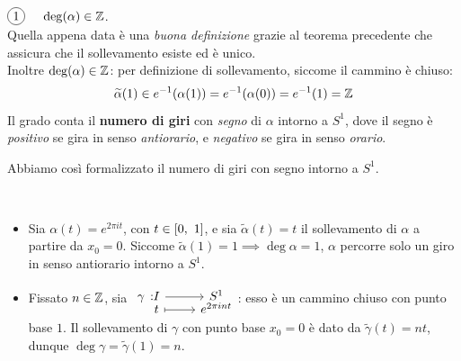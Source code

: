 \begin{observe} $\circled{1}\quad$ \textsc{$\deg(\alpha)\in\mathbb{Z}$.}\\
	Quella appena data è una \textit{buona definizione} grazie al teorema precedente che assicura che il sollevamento esiste ed è unico. \\
	Inoltre $\deg(\alpha)\in\mathbb{Z}$: per definizione di sollevamento, siccome il cammino è chiuso:
	\begin{equation*}
		\widetilde{\alpha}(1)\in e^{-1}(\alpha(1))=e^{-1}(\alpha(0))=e^{-1}(1)=\mathbb{Z}
	\end{equation*}
	Il grado conta il \textbf{numero di giri} con \textit{segno} di $\alpha$ intorno a $S^1$, dove il segno è \textit{positivo} se gira in senso \textit{antiorario}, e \textit{negativo} se gira in senso \textit{orario}.
\end{observe}
Abbiamo così formalizzato il numero di giri con segno intorno a $S^1$.
\begin{examples}~{}
	\begin{itemize}
		\item Sia $\alpha(t)=e^{2\pi i t}$, con $t\in\left[0,\ 1\right]$, e sia $\widetilde{\alpha}(t)=t$ il sollevamento di $\alpha$ a partire da $x_0=0$. Siccome $\widetilde{\alpha}(1)=1\implies \deg\alpha=1$, $\alpha$ percorre solo un giro in senso antiorario intorno a $S^1$.
		\item Fissato $n\in\mathbb{Z}$, sia $\displaystyle \funztot \gamma I {S^1} t {e^{2\pi i nt}}$: esso è un cammino chiuso con punto base $1$. Il sollevamento di $\gamma$ con punto base $x_0=0$ è dato da $\widetilde{\gamma}(t)=nt$, dunque $\deg\gamma=\widetilde{\gamma}(1)=n$.
	\end{itemize}
\vspace{-3mm}
\end{examples}

